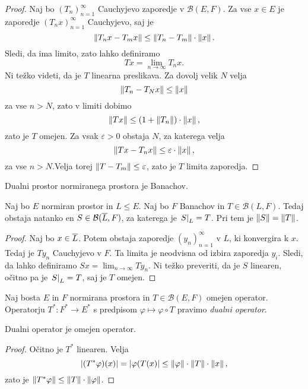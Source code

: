 \begin{proof}
Naj bo $(T_n)_{n=1}^\infty$ Cauchyjevo zaporedje v
$\mathcal{B}(E,F)$. Za vse $x \in E$ je zaporedje
$(T_n x)_{n=1}^\infty$ Cauchyjevo, saj je
\[
\left\lVert T_n x - T_m x\right\rVert \leq \left\lVert T_n - T_m\right\rVert \cdot \left\lVert x\right\rVert.
\]
Sledi, da ima limito, zato lahko definiramo
\[
Tx = \lim_{n \to \infty} T_n x.
\]
Ni težko videti, da je $T$ linearna preslikava. Za dovolj velik $N$
velja
\[
\left\lVert T_n - T_N x\right\rVert \leq \left\lVert x\right\rVert
\]
za vse $n > N$, zato v limiti dobimo
\[
\left\lVert Tx\right\rVert \leq (1 + \left\lVert T_n\right\rVert) \cdot \left\lVert x\right\rVert,
\]
zato je $T$ omejen. Za vsak $\varepsilon > 0$ obstaja $N$, za
katerega velja
\[
\left\lVert Tx - T_n x\right\rVert \leq \varepsilon \cdot \left\lVert x\right\rVert,
\]
za vse $n > N$.Velja torej $\left\lVert T - T_m\right\rVert \leq \varepsilon$, zato
je $T$ limita zaporedja.
\end{proof}

\begin{posledica}
Dualni prostor normiranega prostora je Banachov.
\end{posledica}

\begin{posledica}
Naj bo $E$ normiran prostor in $L \leq E$. Naj bo $F$ Banachov in
$T \in \mathcal{B}(L,F)$. Tedaj obstaja natanko en
$S \in \mathcal{B}(\overline{L},F)$, za katerega je
$\left. S\right|_{L}^{} = T$. Pri tem je $\left\lVert S\right\rVert = \left\lVert T\right\rVert$.
\end{posledica}

\begin{proof}
Naj bo $x \in \overline{L}$. Potem obstaja zaporedje
$(y_n)_{n=1}^\infty$ v $L$, ki konvergira k $x$. Tedaj je $T y_n$
Cauchyjevo v $F$. Ta limita je neodvisna od izbira zaporedja $y_i$.
Sledi, da lahko definiramo $Sx = \lim_{n \to \infty} T y_n$. Ni
težko preveriti, da je $S$ linearen, očitno pa je
$\left. S\right|_{L}^{} = T$, saj je $T$ omejen.
\end{proof}


\begin{definicija}
Naj bosta $E$ in $F$ normirana prostora in $T \in \mathcal{B}(E,F)$
omejen operator. Operatorju $T^* \colon F^* \to E^*$ s predpisom
$\varphi \mapsto \varphi \circ T$ pravimo
\emph{dualni operator}.
\end{definicija}

\begin{lema}
Dualni operator je omejen operator.
\end{lema}

\begin{proof}
Očitno je $T^*$ linearen. Velja
\[
\left\lvert (T^* \varphi)(x)\right\rvert = \left\lvert \varphi(T(x)\right\rvert \leq
\left\lVert \varphi\right\rVert \cdot \left\lVert T\right\rVert \cdot \left\lVert x\right\rVert,
\]
zato je $\left\lVert T^* \varphi\right\rVert \leq \left\lVert T\right\rVert \cdot \left\lVert \varphi\right\rVert$.
\end{proof}

